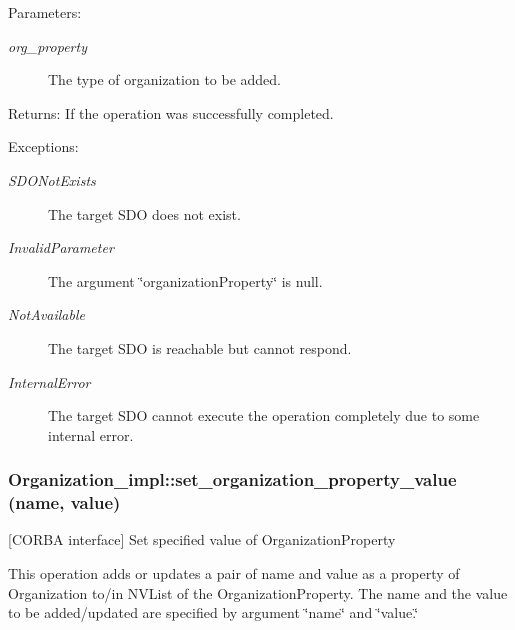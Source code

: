 \begin{Desc}
\item[Parameters:]
\begin{description}
\item[{\em org\_\-property}]The type of organization to be added. \end{description}
\end{Desc}
\begin{Desc}
\item[Returns:]If the operation was successfully completed. \end{Desc}
\begin{Desc}
\item[Exceptions:]
\begin{description}
\item[{\em SDONot\-Exists}]The target SDO does not exist. \item[{\em Invalid\-Parameter}]The argument \char`\"{}organization\-Property\char`\"{} is null. \item[{\em Not\-Available}]The target SDO is reachable but cannot respond. \item[{\em Internal\-Error}]The target SDO cannot execute the operation completely due to some internal error.\end{description}
\end{Desc}
\subsubsection{\setlength{\rightskip}{0pt plus 5cm}Organization\_\-impl::set\_\-organization\_\-property\_\-value (name, value)}\label{classOrganization__impl_Organization__impla4}


[CORBA interface] Set specified value of Organization\-Property 

This operation adds or updates a pair of name and value as a property of Organization to/in NVList of the Organization\-Property. The name and the value to be added/updated are specified by argument \char`\"{}name\char`\"{} and \char`\"{}value.\char`\"{}

